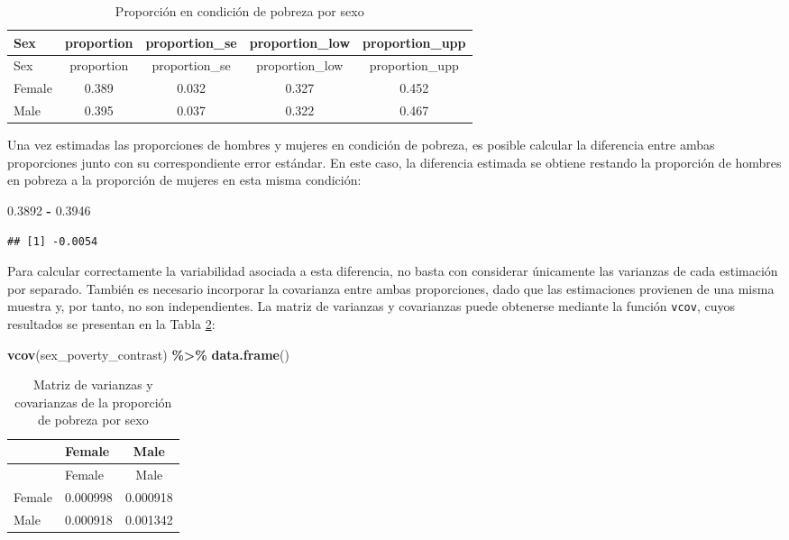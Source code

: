 \documentclass[
  spanish,
  12pt,
]{book}
\newenvironment{Shaded}{\begin{snugshade}}{\end{snugshade}}
\newcommand{\FloatTok}[1]{\textcolor[rgb]{0.00,0.00,0.81}{#1}}
\newcommand{\FunctionTok}[1]{\textcolor[rgb]{0.13,0.29,0.53}{\textbf{#1}}}
\newcommand{\NormalTok}[1]{#1}
\newcommand{\SpecialCharTok}[1]{\textcolor[rgb]{0.81,0.36,0.00}{\textbf{#1}}}
\begin{document}
\begin{longtable}[]{@{}lcccc@{}}
\caption{\label{tab:tab-svyby-pobreza-sexo2}Proporción en condición de pobreza por sexo}\tabularnewline
\toprule\noalign{}
Sex & proportion & proportion\_se & proportion\_low & proportion\_upp \\
\midrule\noalign{}
\endfirsthead
\toprule\noalign{}
Sex & proportion & proportion\_se & proportion\_low & proportion\_upp \\
\midrule\noalign{}
\endhead
\bottomrule\noalign{}
\endlastfoot
Female & 0.389 & 0.032 & 0.327 & 0.452 \\
Male & 0.395 & 0.037 & 0.322 & 0.467 \\
\end{longtable}

Una vez estimadas las proporciones de hombres y mujeres en condición de pobreza, es posible calcular la diferencia entre ambas proporciones junto con su correspondiente error estándar. En este caso, la diferencia estimada se obtiene restando la proporción de hombres en pobreza a la proporción de mujeres en esta misma condición:

\begin{Shaded}
\begin{Highlighting}[]
\FloatTok{0.3892} \SpecialCharTok{{-}} \FloatTok{0.3946}
\end{Highlighting}
\end{Shaded}

\begin{verbatim}
## [1] -0.0054
\end{verbatim}

Para calcular correctamente la variabilidad asociada a esta diferencia, no basta con considerar únicamente las varianzas de cada estimación por separado. También es necesario incorporar la covarianza entre ambas proporciones, dado que las estimaciones provienen de una misma muestra y, por tanto, no son independientes. La matriz de varianzas y covarianzas puede obtenerse mediante la función \texttt{vcov}, cuyos resultados se presentan en la Tabla \ref{tab:tab-vcov-sex-pobreza}:

\begin{Shaded}
\begin{Highlighting}[]
\FunctionTok{vcov}\NormalTok{(sex\_poverty\_contrast) }\SpecialCharTok{\%\textgreater{}\%}
  \FunctionTok{data.frame}\NormalTok{()}
\end{Highlighting}
\end{Shaded}

\begin{longtable}[]{@{}llc@{}}
\caption{\label{tab:tab-vcov-sex-pobreza}Matriz de varianzas y covarianzas de la proporción de pobreza por sexo}\tabularnewline
\toprule\noalign{}
& Female & Male \\
\midrule\noalign{}
\endfirsthead
\toprule\noalign{}
& Female & Male \\
\midrule\noalign{}
\endhead
\bottomrule\noalign{}
\endlastfoot
Female & 0.000998 & 0.000918 \\
Male & 0.000918 & 0.001342 \\
\end{longtable}
\end{document}
